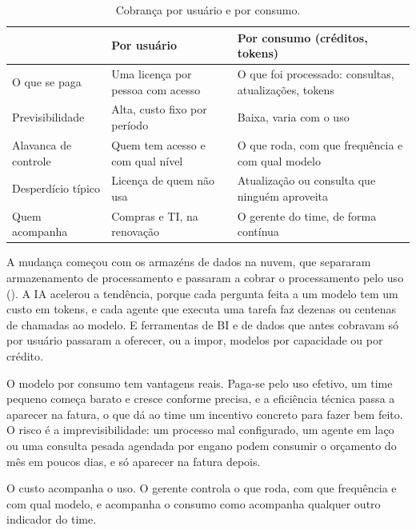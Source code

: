 \begin{table}[htbp]
  \centering
  \caption{Cobrança por usuário e por consumo.}
  \label{tab:usuario-consumo}
  \small
  \begin{tabularx}{\textwidth}{@{}>{\raggedright\arraybackslash}p{}
      >{\raggedright\arraybackslash}X>{\raggedright\arraybackslash}X@{}}
    \toprule
    & Por usuário & Por consumo (créditos, tokens) \\
    \midrule
    O que se paga & Uma licença por pessoa com acesso & O que foi processado: consultas, atualizações, tokens \\
    \addlinespace
    Previsibilidade & Alta, custo fixo por período & Baixa, varia com o uso \\
    \addlinespace
    Alavanca de controle & Quem tem acesso e com qual nível & O que roda, com que frequência e com qual modelo \\
    \addlinespace
    Desperdício típico & Licença de quem não usa & Atualização ou consulta que ninguém aproveita \\
    \addlinespace
    Quem acompanha & Compras e TI, na renovação & O gerente do time, de forma contínua \\
    \bottomrule
  \end{tabularx}
\end{table}

A mudança começou com os armazéns de dados na nuvem, que separaram armazenamento de
processamento e passaram a cobrar o processamento pelo uso (). A IA
acelerou a tendência, porque cada pergunta feita a um modelo tem um custo em tokens, e cada
agente que executa uma tarefa faz dezenas ou centenas de chamadas ao modelo. E ferramentas de
BI e de dados que antes cobravam só por usuário passaram a oferecer, ou a impor, modelos por
capacidade ou por crédito. 

O modelo por consumo tem vantagens reais. Paga-se pelo uso efetivo, um time pequeno começa
barato e cresce conforme precisa, e a eficiência técnica passa a aparecer na fatura, o que dá
ao time um incentivo concreto para fazer bem feito. O risco é a imprevisibilidade: um processo
mal configurado, um agente em laço ou uma consulta pesada agendada por engano podem consumir o
orçamento do mês em poucos dias, e só aparecer na fatura depois.

{O custo acompanha o uso. O gerente controla o que roda, com que frequência e com qual
  modelo, e acompanha o consumo como acompanha qualquer outro indicador do time.}

